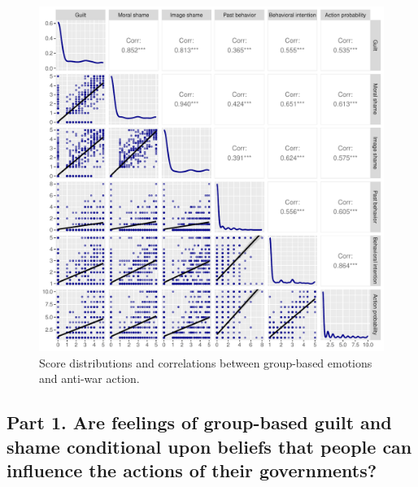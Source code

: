\documentclass[
]{article}
\begin{document}
\begin{figure}

{\centering \includegraphics{corplot} 

}

\caption{Score distributions and correlations between group-based emotions and anti-war action.}\label{fig:corplots}
\end{figure}

\allsectionsfont{\raggedright}

\subsection*{Part 1. Are feelings of group-based guilt and shame conditional upon beliefs that people can influence the actions of their governments?}\label{part-1.-are-feelings-of-group-based-guilt-and-shame-conditional-upon-beliefs-that-people-can-influence-the-actions-of-their-governments}
\end{document}
